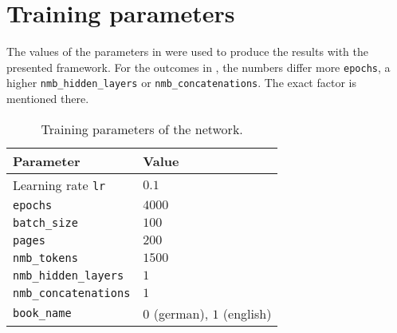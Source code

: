 \chapter{Training parameters} \label{ap: parameters}
%
The values of the parameters in \tabref{\ref{tab: training parameters}} were used to produce the results with the presented framework. For the outcomes in , the numbers differ \eg more \texttt{epochs}, a higher \texttt{nmb\_hidden\_layers} or \texttt{nmb\_concatenations}. The exact factor is mentioned there.
\begin{table}[H]
	\centering
	\caption{Training parameters of the network.}
	\begin{tabular}{ll}
		\toprule
		Parameter & Value \\
		\midrule
		Learning rate \texttt{lr} & $ 0.1 $ \\
		\texttt{epochs} & $ 4000 $ \\
		\texttt{batch\_size} & $ 100 $ \\
		\texttt{pages} & $ 200 $ \\
		\texttt{nmb\_tokens} & $ 1500 $ \\
		\texttt{nmb\_hidden\_layers} & $ 1 $ \\
		\texttt{nmb\_concatenations} & $ 1 $ \\
		\texttt{book\_name} & $ 0 $ (german), $ 1 $ (english)\\
		\bottomrule
	\end{tabular}
	\label{tab: training parameters}
\end{table}

